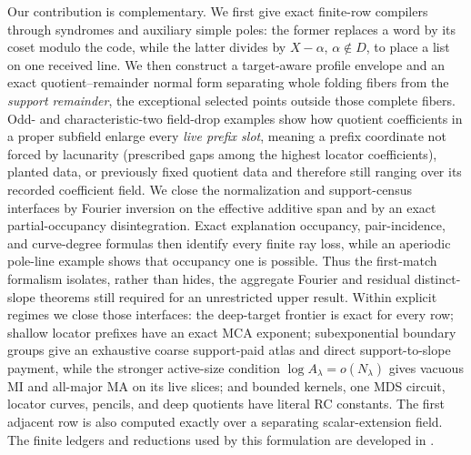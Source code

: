 \documentclass[12pt,a4paper]{amsart}
\numberwithin{equation}{section}
\theoremstyle{remark}
\begin{document}
Our contribution is complementary.  We first give exact finite-row
compilers through syndromes and auxiliary simple poles: the former replaces
a word by its coset modulo the code, while the latter divides by
\(X-\alpha\), \(\alpha\notin D\), to place a list on one received line.
We then construct a target-aware profile envelope and an exact
quotient--remainder normal form separating whole folding fibers from the
\emph{support remainder}, the exceptional selected points outside those
complete fibers.  Odd- and characteristic-two
field-drop examples show how quotient coefficients in a proper subfield
enlarge every \emph{live prefix slot}, meaning a prefix coordinate not
forced by lacunarity (prescribed gaps among the highest locator
coefficients), planted data, or previously fixed quotient data and
therefore still ranging over its recorded coefficient field.  We close the
normalization and support-census interfaces by Fourier inversion on the
effective additive span and by an exact partial-occupancy disintegration.
Exact explanation occupancy, pair-incidence, and curve-degree formulas
then identify every finite ray loss, while an aperiodic pole-line example
shows that occupancy one is possible.  Thus the first-match formalism
isolates, rather than hides, the aggregate Fourier and residual
distinct-slope theorems still required for an unrestricted upper result.
Within explicit regimes we close those interfaces: the deep-target
frontier is exact for every row; shallow locator prefixes have an exact
MCA exponent; subexponential boundary groups give an exhaustive coarse
support-paid atlas and direct support-to-slope payment, while the stronger
active-size condition \(\log A_\lambda=o(N_\lambda)\) gives vacuous MI and
all-major MA on its live slices; and bounded kernels, one MDS circuit,
locator curves, pencils, and deep quotients have literal RC constants.
The first adjacent row is also computed exactly over a separating
scalar-extension field.
The finite ledgers and
reductions used by this formulation are developed in
\cite{Cho26CapV13,Cho26Grande}.
\end{document}
